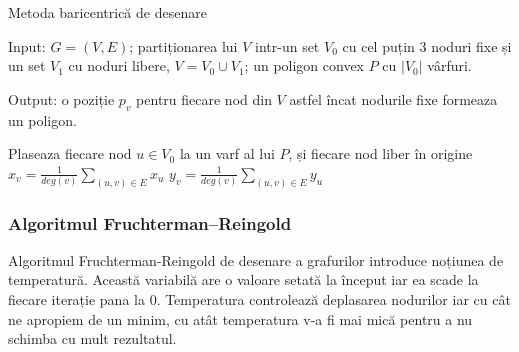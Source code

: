 \begin{algorithm}[H]
    \caption{Metoda baricentrică de desenare}
    Input: \(G=(V,E)\);\newline
    partiționarea lui \(V\) intr-un set \(V_0\) cu cel puțin 3 noduri fixe și un set \(V_1\) cu noduri libere, \(V=V_0 \cup V_1\);\newline
    un poligon convex \(P\) cu \(|V_0|\) vârfuri.\newline

    Output: o poziție \(p_v\) pentru fiecare nod din \(V\) astfel încat nodurile fixe formeaza un poligon.
        
    \begin{algorithmic}[1]
        \State Plaseaza fiecare nod \(u \in V_0\) la un varf al lui \(P\), și fiecare nod liber în origine
        \Repeat
            \State \(x_v=\frac{1}{deg(v)} \sum_{(u,v) \in E} x_u\)
            \State \(y_v=\frac{1}{deg(v)} \sum_{(u,v) \in E} y_u\)
        \EndFor
    \end{algorithmic}
\end{algorithm}

\subsubsection{Algoritmul Fruchterman–Reingold}

Algoritmul Fruchterman-Reingold de desenare a grafurilor introduce noțiunea de temperatură. Această variabilă are o valoare setată 
la început iar ea scade la fiecare iterație pana la \(0\). Temperatura controlează deplasarea nodurilor iar cu 
cât ne apropiem de un minim, cu atât temperatura v-a fi mai mică pentru a nu schimba cu mult rezultatul.

